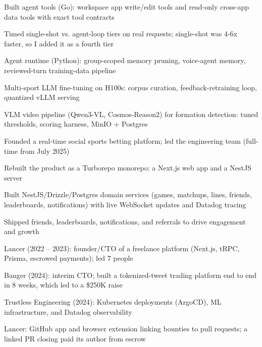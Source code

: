 \documentclass[print]{jack-resume}
\begin{document}
\begin{tightemize}
    \item Built agent tools (Go): workspace app write/edit tools and read-only cross-app data tools with exact tool contracts
    \item Timed single-shot vs. agent-loop tiers on real requests; single-shot was 4-6x faster, so I added it as a fourth tier
    \item Agent runtime (Python): group-scoped memory pruning, voice-agent memory, reviewed-turn training-data pipeline
    \item Multi-sport LLM fine-tuning on H100s: corpus curation, feedback-retraining loop, quantized vLLM serving
    \item VLM video pipeline (Qwen3-VL, Cosmos-Reason2) for formation detection: tuned thresholds, scoring harness, MinIO + Postgres
\end{tightemize}
\sectionsep

\begin{tightemize}
    \item Founded a real-time social sports betting platform; led the engineering team (full-time from July 2025)
    \item Rebuilt the product as a Turborepo monorepo: a Next.js web app and a NestJS server
    \item Built NestJS/Drizzle/Postgres domain services (games, matchups, lines, friends, leaderboards, notifications) with live WebSocket updates and Datadog tracing
    \item Shipped friends, leaderboards, notifications, and referrals to drive engagement and growth
\end{tightemize}
\sectionsep

\begin{tightemize}
    \item Lancer (2022 -- 2023): founder/CTO of a freelance platform (Next.js, tRPC, Prisma, escrowed payments); led 7 people
    \item Banger (2024): interim CTO; built a tokenized-tweet trading platform end to end in 8 weeks, which led to a \$250K raise
    \item Trustless Engineering (2024): Kubernetes deployments (ArgoCD), ML infrastructure, and Datadog observability
    \item Lancer: GitHub app and browser extension linking bounties to pull requests; a linked PR closing paid its author from escrow
\end{tightemize}
\sectionsep
\end{document}
